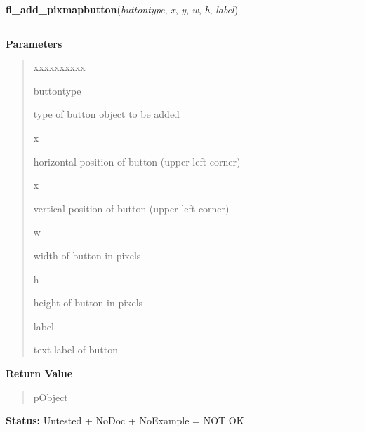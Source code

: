 \hspace{.8\funcindent}\begin{boxedminipage}{\funcwidth}

    \raggedright \textbf{fl\_add\_pixmapbutton}(\textit{buttontype}, \textit{x}, \textit{y}, \textit{w}, \textit{h}, \textit{label})

    \vspace{-1.5ex}

    \rule{\textwidth}{0.5\fboxrule}
\setlength{\parskip}{2ex}
\setlength{\parskip}{1ex}
      \textbf{Parameters}
      \vspace{-1ex}

      \begin{quote}
        \begin{Ventry}{xxxxxxxxxx}

          \item[buttontype]

          type of button object to be added

          \item[x]

          horizontal position of button (upper-left corner)

          \item[x]

          vertical position of button (upper-left corner)

          \item[w]

          width of button in pixels

          \item[h]

          height of button in pixels

          \item[label]

          text label of button

        \end{Ventry}

      \end{quote}

      \textbf{Return Value}
    \vspace{-1ex}

      \begin{quote}
      pObject

      \end{quote}

\textbf{Status:} Untested + NoDoc + NoExample = NOT OK



    \end{boxedminipage}

